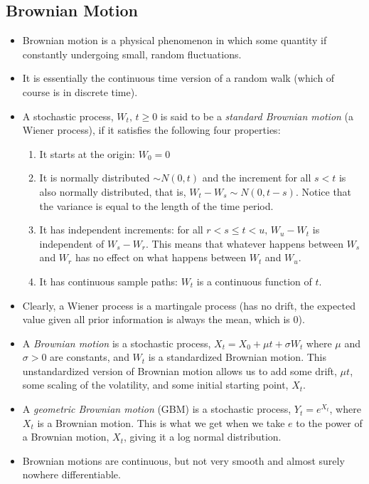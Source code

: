 \documentclass[11pt]{article}
\begin{document}
\subsection{Brownian Motion}
\begin{itemize}
    \item Brownian motion is a physical phenomenon in which some quantity if constantly 
    undergoing small, random fluctuations.
    \item It is essentially the continuous time version of a random walk (which of course is in 
    discrete time).
    \item A stochastic process, $W_t, \, t \ge 0$ is said to be a \textit{standard Brownian 
    motion} (a Wiener process), if it satisfies the following four properties: 
    \begin{enumerate}
        \item It starts at the origin: $W_0 = 0$
        \item It is normally distributed  $\sim N(0,t)$ and the increment for all $s<t$ is 
        also normally distributed, that is, $W_t - W_s \sim N(0, t-s)$. Notice that the 
        variance is equal to the length of the time period. 
        \item It has independent increments: for all $r<s \le t<u, \, W_u - W_t$ is 
        independent of $W_s - W_r$. This means that whatever happens between $W_s$ and $W_r$ 
        has no effect on what happens between $W_t$ and $W_u$.
        \item It has continuous sample paths: $W_t$ is a continuous function of $t$.
    \end{enumerate}
    \item Clearly, a Wiener process is a martingale process (has no drift, the expected 
    value given all prior information is always the mean, which is 0). 
    \item A \textit{Brownian motion} is a stochastic process, $X_t = X_0 + \mu t + \sigma W_t$
    where $\mu$ and $\sigma > 0$ are constants, and $W_t$ is a standardized Brownian motion. 
    This unstandardized version of Brownian motion allows us to add some drift, $\mu t$, some 
    scaling of the volatility, and some initial starting point, $X_t$.
    \item A \textit{geometric Brownian motion} (GBM) is a stochastic process, $Y_t = e^{X_t}$, 
    where $X_t$ is a Brownian motion. This is what we get when we take $e$ to the power of a 
    Brownian motion, $X_t$, giving it a log normal distribution.
    \item Brownian motions are continuous, but not very smooth and almost surely nowhere 
    differentiable. 
\end{itemize}
\end{document}
